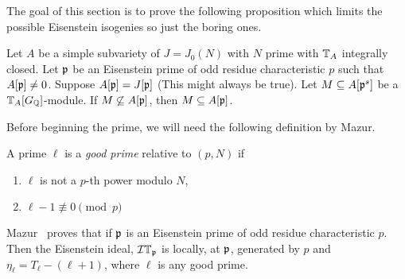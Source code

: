 \documentclass[thesis.tex]{subfiles}
\begin{document}
The goal of this section is to prove the following proposition which limits the
possible Eisenstein isogenies so just the boring ones.
\begin{proposition}
    Let $A$ be a simple subvariety of $J=J_0(N)$ with $N$ prime with $\mathbb{T}_A$
    integrally closed. Let $\mathfrak{p}$ be an Eisenstein prime of odd residue
    characteristic $p$ such that $A[\mathfrak{p}]\neq 0$. Suppose $A[\mathfrak{p}]=J[\mathfrak{p}]$ (This
    might always be true). Let $M\subseteq A[\mathfrak{p}^s]$ be a $\mathbb{T}_A[G_{\mathbb{Q}}]$-module.
    If $M \not\subseteq A[\mathfrak{p}]$, then $M\subseteq A[\mathfrak{p}]$.
\end{proposition}
Before beginning the prime, we will need the following definition by Mazur.
\begin{definition}
    A prime $\ell$ is a \emph{good prime} relative to $(p, N)$ if 
    \begin{enumerate}
        \item
            $\ell$ is not a $p$-th power modulo $N$,
        \item
            $\ell-1\not\equiv 0 \pmod{p}$
    \end{enumerate}
\end{definition}
Mazur~\cite[Prop 16.1]{mazur:eisenstein} proves that if $\mathfrak{p}$ is an Eisenstein
prime of odd residue characteristic $p$. Then the Eisenstein ideal, $\mathcal{I} \mathbb{T}_{\mathfrak{p}}$
is locally, at $\mathfrak{p}$, generated by $p$ and $\eta_\ell = T_\ell - (\ell+1)$,
where $\ell$ is any good prime.
\end{document}
